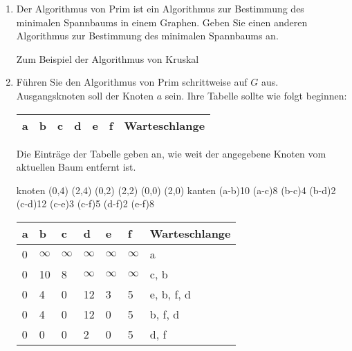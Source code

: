 \documentclass{lehramt-informatik}
\begin{document}
\begin{enumerate}


\item Der Algorithmus von Prim ist ein Algorithmus zur Bestimmung des
minimalen Spannbaums in einem Graphen. Geben Sie einen anderen
Algorithmus zur Bestimmung des minimalen Spannbaums an.

\begin{antwort}
Zum Beispiel der Algorithmus von Kruskal
\end{antwort}


\item Führen Sie den Algorithmus von Prim schrittweise auf $G$ aus.
Ausgangsknoten soll der Knoten $a$ sein. Ihre Tabelle sollte wie folgt
beginnen:

\begin{tabular}{|l|l|l|l|l|l|l|}
\hline
a &
b &
c &
d &
e &
f &
Warteschlange\\\hline
\end{tabular}

Die Einträge der Tabelle geben an, wie weit der angegebene Knoten
vom aktuellen Baum entfernt ist.

\begin{antwort}
\graph knoten {
  (0,4)
  (2,4)
  (0,2)
  (2,2)
  (0,0)
  (2,0)
} kanten {
  \kante(a-b){10}
  \KANTE(a-c){8}
  \KANTE(b-c){4}
  \KANTE(b-d){2}
  \kante(c-d){12}
  \KANTE(c-e){3}
  \kante(c-f){5}
  \KANTE(d-f){2}
  \kante(e-f){8}
}

\begin{tabular}{|l|l|l|l|l|l|l|}
\hline
a &
b &
c &
d &
e &
f &
Warteschlange\\\hline\hline

0 & %
$\infty$ & %
$\infty$ & %
$\infty$ & %
$\infty$ & %
$\infty$ & %
a \\\hline %

0 & %
10 & %
8 & %
$\infty$ & %
$\infty$ & %
$\infty$ & %
c, b\\\hline %

0 & %
4 & %
0 & %
12 & %
3 & %
5 & %
e, b, f, d\\\hline %

0 & %
4 & %
0 & %
12 & %
0 & %
5 & %
b, f, d \\\hline %

0 & %
0 & %
0 & %
2 & %
0 & %
5 & %
d, f \\\hline %


\end{tabular}
\end{antwort}
\end{enumerate}
\end{document}
